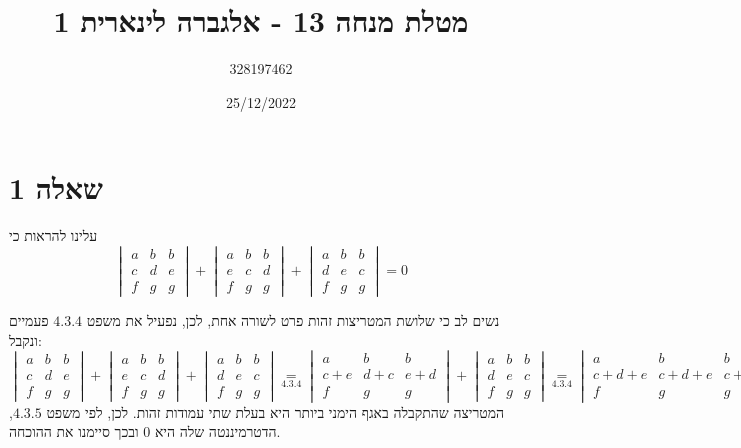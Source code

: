 \documentclass{article}
\title{מטלת מנחה 13 - אלגברה לינארית 1}
\author{328197462}
\date{25/12/2022}
\newcommand\underrel[2]{\mathrel{\mathop{#2}\limits_{#1}}}
\begin{document}
\maketitle

\section*{שאלה 1}

עלינו להראות כי
\[
    \begin{vmatrix}
        a & b & b \\
        c & d & e \\
        f & g & g
    \end{vmatrix} +
    \begin{vmatrix}
        a & b & b \\
        e & c & d \\
        f & g & g
    \end{vmatrix} +
    \begin{vmatrix}
        a & b & b \\
        d & e & c \\
        f & g & g
    \end{vmatrix} = 0
\]

נשים לב כי שלושת המטריצות זהות פרט לשורה אחת, לכן, נפעיל את משפט
$4.3.4$ פעמיים ונקבל:
\[
    \begin{vmatrix}
        a & b & b \\
        c & d & e \\
        f & g & g
    \end{vmatrix} +
    \begin{vmatrix}
        a & b & b \\
        e & c & d \\
        f & g & g
    \end{vmatrix} +
    \begin{vmatrix}
        a & b & b \\
        d & e & c \\
        f & g & g
    \end{vmatrix} \underrel{4.3.4}{=}
    \begin{vmatrix}
        a     & b     & b     \\
        c + e & d + c & e + d \\
        f     & g     & g
    \end{vmatrix} +
    \begin{vmatrix}
        a & b & b \\
        d & e & c \\
        f & g & g
    \end{vmatrix} \underrel{4.3.4}{=}
    \begin{vmatrix}
        a     & b     & b     \\
        c+d+e & c+d+e & c+d+e \\
        f     & g     & g
    \end{vmatrix}
\]
המטריצה שהתקבלה באגף הימני ביותר היא בעלת שתי עמודות זהות.
לכן, לפי משפט $4.3.5$,
הדטרמיננטה שלה היא 0 ובכך סיימנו את ההוכחה.
\end{document}
